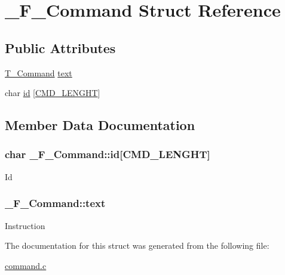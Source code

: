 \hypertarget{struct__F__Command}{}\section{\+\_\+\+F\+\_\+\+Command Struct Reference}
\label{struct__F__Command}
\subsection*{Public Attributes}
\begin{DoxyCompactItemize}
\item 
\hyperlink{command_8h_a0473597db8c45c0289b6b8e2f8abbe32}{T\+\_\+\+Command} \hyperlink{struct__F__Command_a6a2c6e6db16dad0da7732cea69c07559}{text}
\item 
char \hyperlink{struct__F__Command_a138723d3b8278597200ae2ff43d8ef74}{id} \mbox{[}\hyperlink{command_8c_a2b1bd24d2eddf8081d8c541e4cc4fd4b}{C\+M\+D\+\_\+\+L\+E\+N\+G\+HT}\mbox{]}
\end{DoxyCompactItemize}


\subsection{Member Data Documentation}
\subsubsection[{\texorpdfstring{id}{id}}]{\setlength{\rightskip}{0pt plus 5cm}char \+\_\+\+F\+\_\+\+Command\+::id\mbox{[}{\bf C\+M\+D\+\_\+\+L\+E\+N\+G\+HT}\mbox{]}}\hypertarget{struct__F__Command_a138723d3b8278597200ae2ff43d8ef74}{}\label{struct__F__Command_a138723d3b8278597200ae2ff43d8ef74}
Id 
\subsubsection[{\texorpdfstring{text}{text}}]{ \+\_\+\+F\+\_\+\+Command\+::text}\hypertarget{struct__F__Command_a6a2c6e6db16dad0da7732cea69c07559}{}\label{struct__F__Command_a6a2c6e6db16dad0da7732cea69c07559}
Instruction 

The documentation for this struct was generated from the following file\+:\begin{DoxyCompactItemize}
\item 
\hyperlink{command_8c}{command.\+c}\end{DoxyCompactItemize}

